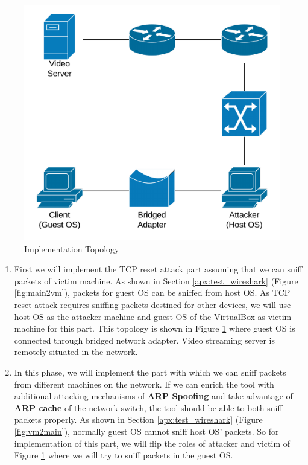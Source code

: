 \documentclass[14pt]{extarticle}
\begin{document}
    \begin{figure}
        \centering
        \includegraphics[width=.75\textwidth]{Pictures/TCP_RST_Topology_Implementation.png}
        \caption{Implementation Topology}
        \label{fig:topolgy_implement}
    \end{figure}
    
    
    \begin{enumerate}
      
      \item First we will implement the TCP reset attack part assuming that we can sniff packets of victim machine. As shown in Section \ref{apx:test_wireshark} (Figure \ref{fig:main2vm}), packets for guest OS can be sniffed from host OS. As TCP reset attack requires sniffing packets destined for other devices, we will use host OS as the attacker machine and guest OS of the VirtualBox as victim machine for this part. This topology is shown in Figure \ref{fig:topolgy_implement} where guest OS is connected through bridged network adapter. Video streaming server is remotely situated in the network.
      
      \item In this phase, we will implement the part with which we can sniff packets from different machines on the network. If we can enrich the tool with additional attacking mechanisms of \textbf{ARP Spoofing} and take advantage of \textbf{ARP cache} of the network switch, the tool should be able to both sniff packets properly. As shown in Section \ref{apx:test_wireshark} (Figure \ref{fig:vm2main}), normally guest OS cannot sniff host OS' packets. So for implementation of this part, we will flip the roles of attacker and victim of Figure \ref{fig:topolgy_implement} where we will try to sniff packets in the guest OS. 
      
      \end{enumerate}
    
\end{document}
